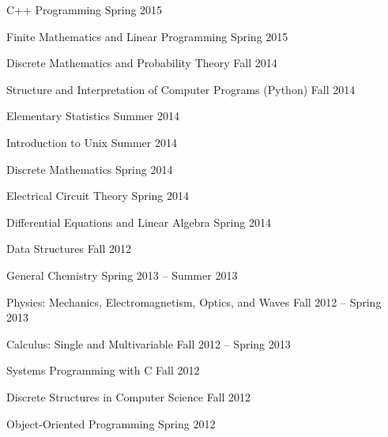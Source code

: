 \documentclass[letterpaper,MMMyyyy,nonstopmode]{simpleresumecv}
\begin{document}
\begin{Body}
\BulletItem
C++ Programming
\hfill Spring 2015

\BulletItem
Finite Mathematics and Linear Programming
\hfill Spring 2015

\BulletItem
Discrete Mathematics and Probability Theory
\hfill Fall 2014

\BulletItem
Structure and Interpretation of Computer Programs (Python)
\hfill Fall 2014

\BigGap

\BulletItem
Elementary Statistics
\hfill Summer 2014

\BulletItem
Introduction to Unix
\hfill Summer 2014

\BulletItem
Discrete Mathematics
\hfill Spring 2014

\BulletItem
Electrical Circuit Theory
\hfill Spring 2014

\BulletItem
Differential Equations and Linear Algebra
\hfill Spring 2014

\BulletItem
Data Structures
\hfill Fall 2012

\BigGap

\BulletItem
General Chemistry
\hfill Spring 2013 -- Summer 2013

\BulletItem
Physics: Mechanics, Electromagnetism, Optics, and Waves
\hfill Fall 2012 -- Spring 2013

\BulletItem
Calculus: Single and Multivariable
\hfill Fall 2012 -- Spring 2013

\BulletItem
Systems Programming with C
\hfill Fall 2012

\BulletItem
Discrete Structures in Computer Science
\hfill Fall 2012

\BulletItem
Object-Oriented Programming
\hfill Spring 2012

\end{Body}
\end{document}
